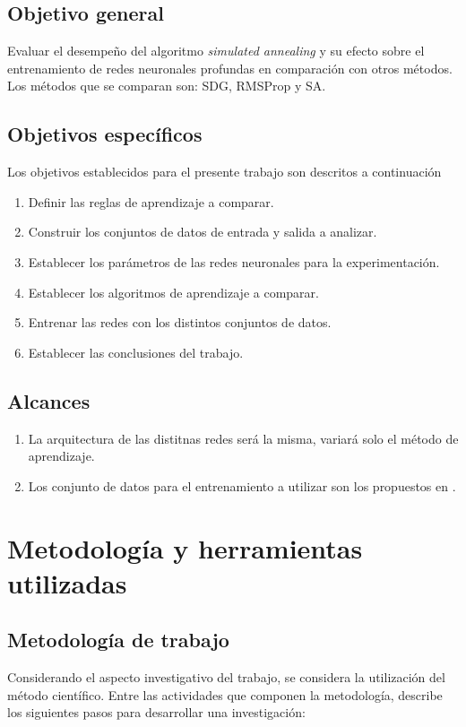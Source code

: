 \subsection{Objetivo general}
Evaluar el desempeño del algoritmo {\em simulated annealing} y su efecto sobre el entrenamiento de redes neuronales profundas en comparación con otros métodos. Los métodos que se comparan son: SDG, RMSProp y SA.

\subsection{Objetivos específicos}
Los objetivos establecidos para el presente trabajo son descritos a continuación
\begin{enumerate}
	\item Definir las reglas de aprendizaje a comparar.
	\item Construir los conjuntos de datos de entrada y salida a analizar.
	\item Establecer los parámetros de las redes neuronales para la experimentación.
	\item Establecer los algoritmos de aprendizaje a comparar.
	\item Entrenar las redes con los distintos conjuntos de datos.
	\item Establecer las conclusiones del trabajo.
\end{enumerate}

\subsection{Alcances}
\begin{enumerate}
	\item La arquitectura de las distitnas redes será la misma, variará solo el método de aprendizaje.
	\item Los conjunto de datos para el entrenamiento a utilizar son los propuestos en \cite{Morse2016}.
\end{enumerate}

\section{Metodología y herramientas utilizadas}
\subsection{Metodología de trabajo}
Considerando el aspecto investigativo del trabajo, se considera la utilización del método científico. Entre las actividades que componen la metodología,  describe los siguientes pasos para desarrollar una investigación:

